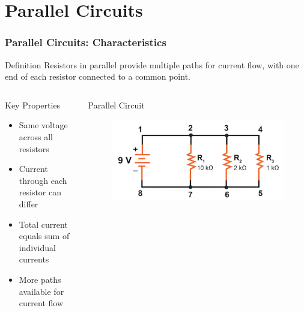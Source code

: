 \documentclass{beamer}
\begin{document}
\section{Parallel Circuits}

\begin{frame}
\frametitle{Parallel Circuits: Characteristics}
\begin{block}{Definition}
Resistors in parallel provide multiple paths for current flow, with one end of each resistor connected to a common point.
\end{block}

\begin{columns}
\begin{block}{Key Properties}
\begin{itemize}
\item Same voltage across all resistors
\item Current through each resistor can differ
\item Total current equals sum of individual currents
\item More paths available for current flow
\end{itemize}
\end{block}

\begin{alertblock}{Parallel Circuit}
\alert{}
\begin{figure}
    \centering
    \includegraphics[width=1\linewidth]{prllrlrl.png}
\end{figure}
\end{alertblock}
\end{columns}
\end{frame}
\end{document}
